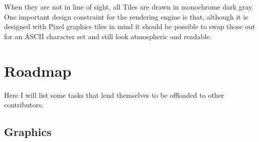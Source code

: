 \documentclass[11pt,a4paper, twocolumn]{article}
\begin{document}
When they are not in line of sight, all Tiles are drawn in monochrome dark gray.
One important design constraint for the rendering engine is that, although it is designed
with Pixel graphics tiles in mind it should be possible to swap those out for an
ASCII character set and still look atmospheric and readable.

\newpage

\section{Roadmap}

Here I will list some tasks that lend themselves to be offloaded to other contributors.

\subsection{Graphics}
\end{document}
